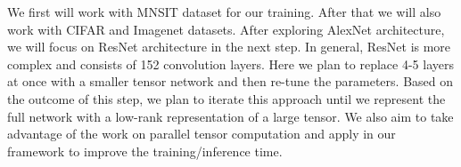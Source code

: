 We first will work with  MNSIT dataset for our training. After that we will also work with CIFAR and Imagenet datasets. After exploring AlexNet architecture, we will focus on ResNet architecture in the next step. In general, ResNet is more complex and consists of 152 convolution layers. Here we plan to replace 4-5 layers at once with a smaller tensor network and then re-tune the parameters. Based on the outcome of this step, we plan to iterate this approach until we represent the full network with a low-rank representation of a large tensor. We also aim to take advantage of the  work on parallel tensor computation and apply in our framework to improve the training/inference time.


%
%
%	


